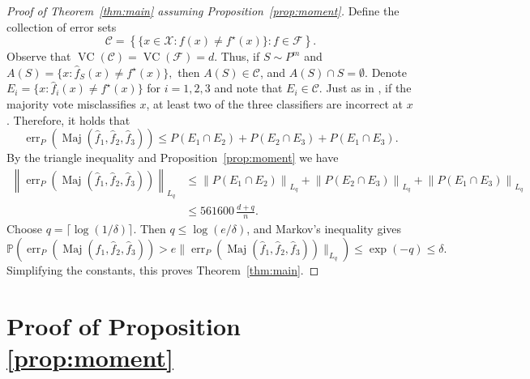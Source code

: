 \documentclass[11pt]{article}
\newcommand{\X}{\mathcal X}
\newcommand{\F}{\mathcal F}
\newcommand{\C}{\mathcal C}
\newcommand{\Prb}{\mathbb P}
\newcommand{\1}{\mathbf 1}
\newcommand{\err}{\operatorname{err}}
\newcommand{\Maj}{\operatorname{Maj}}
\newcommand{\vc}{\operatorname{VC}}
\theoremstyle{plain}
\theoremstyle{remark}
\begin{document}
\begin{proof}[Proof of Theorem~\ref{thm:main} assuming Proposition~\ref{prop:moment}]
Define the collection of error sets
\[
\C=\left\{\{x\in\X:f(x)\ne f^\star(x)\}: f\in\F \right\}.
\]
Observe that $\vc(\C)=\vc(\F)=d$. Thus,  if $S\sim P^m$ and
$
A(S)=\{x:\widehat f_S(x)\ne f^\star(x)\},
$
then $ A(S)\in\C$,
and $A(S)\cap S=\emptyset$. Denote  $E_i=\{x:\widehat f_i(x)\ne f^\star(x)\}$ for $i= 1,2,3$ and note that $E_i \in \C$. Just as in \cite{Simon2015}, if the majority vote misclassifies $x$, at least two of the three classifiers are incorrect at $x$. Therefore, it holds that
\[
\err_P\left(\Maj(\widehat f_1,\widehat f_2,\widehat f_3)\right)
\le  P(E_1\cap E_2) + P(E_2\cap E_3) + P(E_1\cap E_3) .
\]
By the triangle inequality and Proposition~\ref{prop:moment} we have
\begin{align*}
\left\|\err_P\left(\Maj(\widehat f_1,\widehat f_2,\widehat f_3)\right)\right\|_{L_q} &\le \left\|P(E_1\cap E_2)\right\|_{L_q}  + \left\|P(E_2\cap E_3)\right\|_{L_q}  + \left\|P(E_1\cap E_3)\right\|_{L_q} 
\\
&\le 561600\,\frac{d+q}{n}.
\end{align*}
Choose $q=\lceil \log(1/\delta)\rceil$.  Then $q\le \log(e/\delta)$, and Markov's inequality gives 
\[
\Prb\left(\err_P\left(\Maj(\widehat f_1,\widehat f_2,\widehat f_3)\right)>e\|\err_P\left(\Maj(\widehat f_1,\widehat f_2,\widehat f_3)\right)\|_{L_q}\right)\le \exp(-q)\le\delta.
\]
Simplifying the constants, this proves Theorem~\ref{thm:main}.
\end{proof}


\section{Proof of Proposition \ref{prop:moment}}
\end{document}

